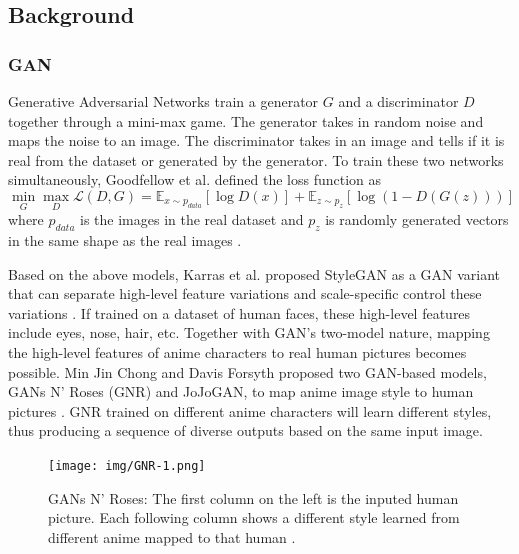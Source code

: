 \subsection*{Background}

\subsubsection*{GAN}
Generative Adversarial Networks train a generator $G$ and a discriminator $D$ together through a mini-max game.
The generator takes in random noise and maps the noise to an image.
The discriminator takes in an image and tells if it is real from the dataset or generated by the generator.
To train these two networks simultaneously, Goodfellow et al. defined the loss function as 
$$
\min_G\max_{D}\mathcal{L}(D, G) = 
\mathbb{E}_{x \sim p_{data}}[\log D(x)] + 
\mathbb{E}_{z \sim p_z}[\log (1 - D(G(z)))]
$$
where $p_{data}$ is the images in the real dataset
and $p_z$ is randomly generated vectors in the same shape as the real images \cite{Goodfellow2020Generative}.

\par
Based on the above models, Karras et al. proposed StyleGAN as 
a GAN variant that can separate high-level feature variations and scale-specific control these variations \cite{Karras2019Style}.
If trained on a dataset of human faces, these high-level features include eyes, nose, hair, etc.
Together with GAN's two-model nature, mapping the high-level features of anime characters to real human pictures becomes possible.
Min Jin Chong and Davis Forsyth proposed two GAN-based models,
GANs N' Roses (GNR) and JoJoGAN,
to map anime image style to human pictures \cite{chong2021gans,chong2021jojogan}.
GNR trained on different anime characters will learn different styles,
thus producing a sequence of diverse outputs based on the same input image.
\begin{figure}[h]
    \texttt{[image: img/GNR-1.png]}
    \caption{
        GANs N' Roses: The first column on the left is the inputed human picture.
        Each following column shows a different style learned from different anime mapped to that human \cite{chong2021gans}.
    }
\end{figure}

